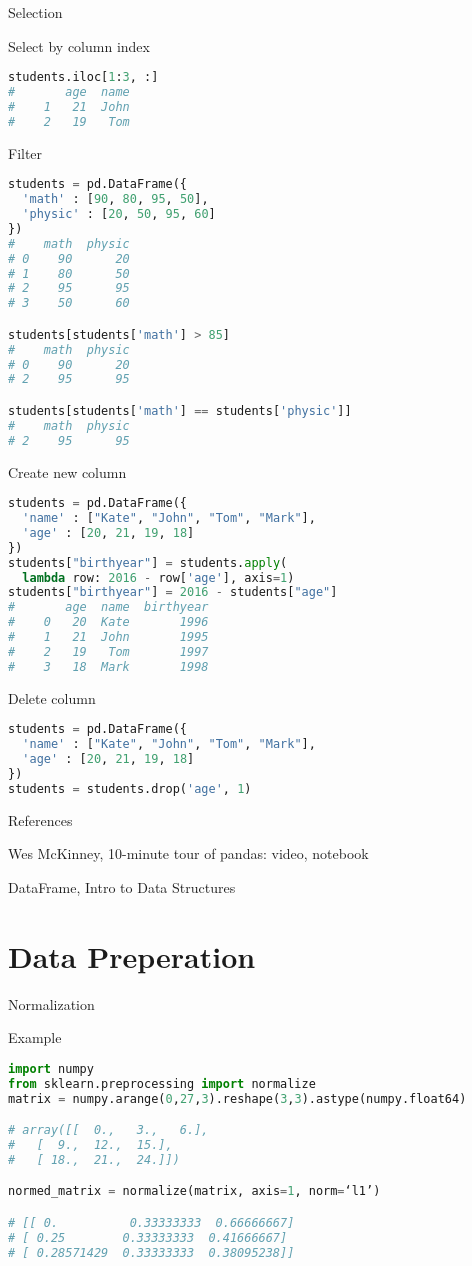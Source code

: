 Selection

Select by column index

\begin{lstlisting}[language=Python]
students.iloc[1:3, :]
#       age  name
#    1   21  John
#    2   19   Tom
\end{lstlisting}

Filter

\begin{lstlisting}[language=Python]
students = pd.DataFrame({
  'math' : [90, 80, 95, 50],
  'physic' : [20, 50, 95, 60]
})
#    math  physic
# 0    90      20
# 1    80      50
# 2    95      95
# 3    50      60

students[students['math'] > 85]
#    math  physic
# 0    90      20
# 2    95      95

students[students['math'] == students['physic']]
#    math  physic
# 2    95      95
\end{lstlisting}

Create new column

\begin{lstlisting}[language=Python]
students = pd.DataFrame({
  'name' : ["Kate", "John", "Tom", "Mark"],
  'age' : [20, 21, 19, 18]
})
students["birthyear"] = students.apply(
  lambda row: 2016 - row['age'], axis=1)
students["birthyear"] = 2016 - students["age"]
#       age  name  birthyear
#    0   20  Kate       1996
#    1   21  John       1995
#    2   19   Tom       1997
#    3   18  Mark       1998
\end{lstlisting}

Delete column

\begin{lstlisting}[language=Python]
students = pd.DataFrame({
  'name' : ["Kate", "John", "Tom", "Mark"],
  'age' : [20, 21, 19, 18]
})
students = students.drop('age', 1)
\end{lstlisting}

References

Wes McKinney, 10-minute tour of pandas: video, notebook

DataFrame, Intro to Data Structures

\section{Data Preperation}

Normalization

Example

\begin{lstlisting}[language=Python]
import numpy
from sklearn.preprocessing import normalize
matrix = numpy.arange(0,27,3).reshape(3,3).astype(numpy.float64)

# array([[  0.,   3.,   6.],
#   [  9.,  12.,  15.],
#   [ 18.,  21.,  24.]])

normed_matrix = normalize(matrix, axis=1, norm=‘l1’)

# [[ 0.          0.33333333  0.66666667]
# [ 0.25        0.33333333  0.41666667]
# [ 0.28571429  0.33333333  0.38095238]]
\end{lstlisting}

